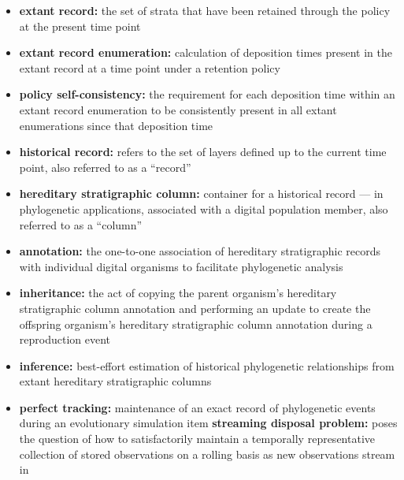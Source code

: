 \begin{itemize}
  \item \textbf{extant record:} the set of strata that have been retained through the policy at the present time point
  \item \textbf{extant record enumeration:} calculation of deposition times present in the extant record at a time point under a retention policy
  \item \textbf{policy self-consistency:} the requirement for each deposition time within an extant record enumeration to be consistently present in all extant enumerations since that deposition time
  \item \textbf{historical record:} refers to the set of layers defined up to the current time point, also referred to as a ``record''
  \item \textbf{hereditary stratigraphic column:} container for a historical record --- in phylogenetic applications, associated with a digital population member, also referred to as a ``column''
  \item \textbf{annotation:} the one-to-one association of hereditary stratigraphic records with individual digital organisms to facilitate phylogenetic analysis
  \item \textbf{inheritance:} the act of copying the parent organism's hereditary stratigraphic column annotation and performing an update to create the offspring organism's hereditary stratigraphic column annotation during a reproduction event
  \item \textbf{inference:} best-effort estimation of historical phylogenetic relationships from extant hereditary stratigraphic columns
  \item \textbf{perfect tracking:} maintenance of an exact record of phylogenetic events during an evolutionary simulation
  item \textbf{streaming disposal problem:} poses the question of how to satisfactorily maintain a temporally representative collection of stored observations on a rolling basis as new observations stream in
\end{itemize}
